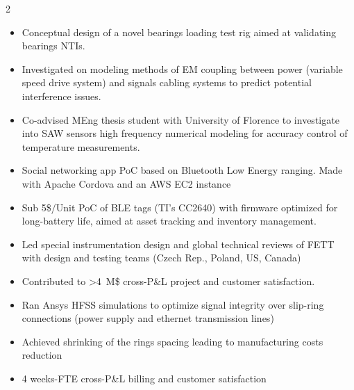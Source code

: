 \documentclass[9pt,a4paper,ragged2e,withhyper]{altacv} %
\begin{document}
\begin{paracol}{2}
\begin{itemize}
\item Conceptual design of a novel bearings loading test rig aimed at validating bearings NTIs.
\item Investigated on modeling methods of EM coupling between power (variable speed drive system) and signals cabling systems to predict potential interference issues.
\end{itemize}
\divider

\begin{itemize}
\item Co-advised MEng thesis student with University of Florence to investigate into SAW sensors high frequency numerical modeling for accuracy control of temperature measurements.
\end{itemize}
\divider

\begin{itemize}
\item Social networking app PoC based on Bluetooth Low Energy ranging. Made with Apache Cordova and an AWS EC2 instance
\end{itemize}
\divider

\begin{itemize}
\item Sub 5\$/Unit PoC of BLE tags (TI's CC2640) with firmware optimized for long-battery life, aimed at asset tracking and inventory management.
\end{itemize}
\divider

\begin{itemize}
\item Led special instrumentation design and global technical reviews of FETT with design and testing teams (Czech Rep., Poland, US, Canada)
\item Contributed to >4~M\$ cross-P\&L project and customer satisfaction.
\end{itemize}
\divider

\begin{itemize}
\item Ran Ansys HFSS simulations to optimize signal integrity over slip-ring connections (power supply and ethernet transmission lines)
\item Achieved shrinking of the rings spacing leading to manufacturing costs reduction
\item 4 weeks-FTE cross-P\&L billing and customer satisfaction
\end{itemize}
\divider


\end{paracol}
\end{document}
